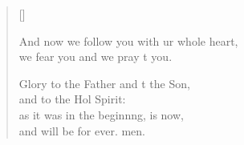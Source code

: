 \begin{verse}[\versewidth]
\begin{patverse}
And now we follow you with ur whole heart,\Med\\
we fear you and we pray t you.

Glory to the Father and t the Son,\Med\\
    and to the Hol Spirit:\\
as it was in the beginn\pointup{\i}ng, is now,\Med\\
    and will be for ever. men.
  \end{patverse}
\end{verse}
